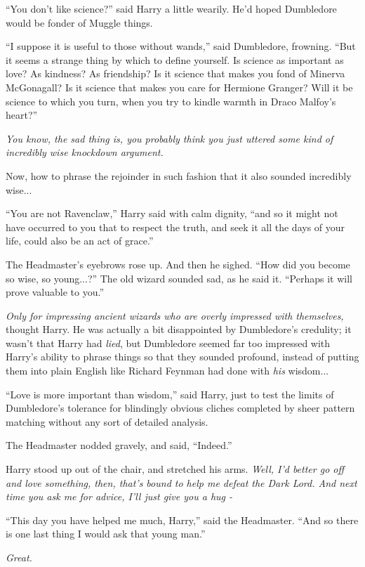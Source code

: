 ``You don't like science?'' said Harry a little wearily. He'd hoped Dumbledore would be fonder of Muggle things.

``I suppose it is useful to those without wands,'' said Dumbledore, frowning. ``But it seems a strange thing by which to define yourself. Is science as important as love? As kindness? As friendship? Is it science that makes you fond of Minerva McGonagall? Is it science that makes you care for Hermione Granger? Will it be science to which you turn, when you try to kindle warmth in Draco Malfoy's heart?''

\emph{You know, the sad thing is, you probably think you just uttered some kind of incredibly wise knockdown argument.}

Now, how to phrase the rejoinder in such fashion that it also sounded incredibly wise...

``You are not Ravenclaw,'' Harry said with calm dignity, ``and so it might not have occurred to you that to respect the truth, and seek it all the days of your life, could also be an act of grace.''

The Headmaster's eyebrows rose up. And then he sighed. ``How did you become so wise, so young...?'' The old wizard sounded sad, as he said it. ``Perhaps it will prove valuable to you.''

\emph{Only for impressing ancient wizards who are overly impressed with themselves,} thought Harry. He was actually a bit disappointed by Dumbledore's credulity; it wasn't that Harry had \emph{lied}, but Dumbledore seemed far too impressed with Harry's ability to phrase things so that they sounded profound, instead of putting them into plain English like Richard Feynman had done with \emph{his} wisdom...

``Love is more important than wisdom,'' said Harry, just to test the limits of Dumbledore's tolerance for blindingly obvious cliches completed by sheer pattern matching without any sort of detailed analysis.

The Headmaster nodded gravely, and said, ``Indeed.''

Harry stood up out of the chair, and stretched his arms. \emph{Well, I'd better go off and love something, then, that's bound to help me defeat the Dark Lord. And next time you ask me for advice, I'll just give you a hug -}

``This day you have helped me much, Harry,'' said the Headmaster. ``And so there is one last thing I would ask that young man.''

\emph{Great.}

